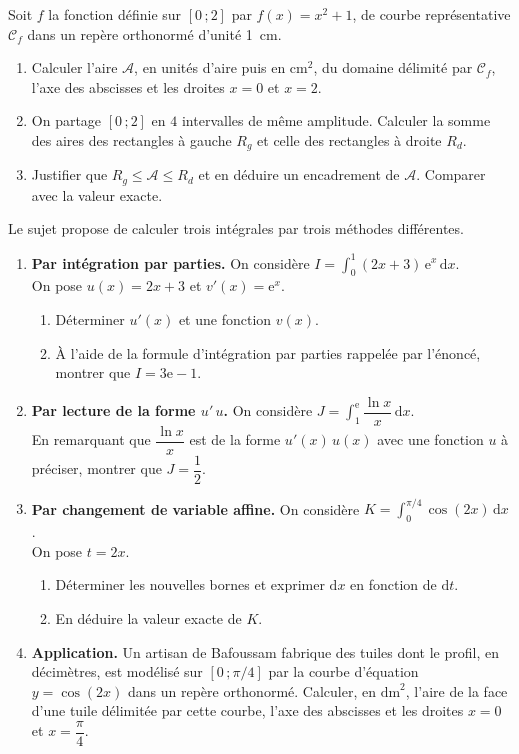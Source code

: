 \documentclass[11pt]{article}
\newcounter{popsec}
\newcounter{popsub}
\newcommand{\courssub}[1]{%
  \stepcounter{popsub}%
  \par\vspace{9pt}\noindent{\popxbold\fontsize{11.5}{13}\selectfont\color{popink}{\color{poporange}\thepopsec.\thepopsub}\hspace{6pt}#1}\par\nopagebreak\vspace{4pt}
}
\begin{document}
\begin{exercice}
Soit $f$ la fonction définie sur $[0\,;2]$ par $f(x)=x^2+1$, de courbe représentative $\mathcal{C}_f$ dans un repère orthonormé d'unité \SI{1}{cm}.
\begin{enumerate}
\item Calculer l'aire $\mathcal{A}$, en unités d'aire puis en $\mathrm{cm}^2$, du domaine délimité par $\mathcal{C}_f$, l'axe des abscisses et les droites $x=0$ et $x=2$.
\item On partage $[0\,;2]$ en $4$ intervalles de même amplitude. Calculer la somme des aires des rectangles à gauche $R_g$ et celle des rectangles à droite $R_d$.
\item Justifier que $R_g \le \mathcal{A} \le R_d$ et en déduire un encadrement de $\mathcal{A}$. Comparer avec la valeur exacte.
\end{enumerate}
\end{exercice}

\courssub{Je me prépare au Bac}

\begin{exercice}
Le sujet propose de calculer trois intégrales par trois méthodes différentes.
\begin{enumerate}
\item \textbf{Par intégration par parties.} On considère $I=\displaystyle\int_0^1 (2x+3)\,\mathrm{e}^{x}\,\mathrm{d}x$.\\
On pose $u(x)=2x+3$ et $v'(x)=\mathrm{e}^{x}$.
\begin{enumerate}
\item Déterminer $u'(x)$ et une fonction $v(x)$.
\item À l'aide de la formule d'intégration par parties rappelée par l'énoncé, montrer que $I=3\mathrm{e}-1$.
\end{enumerate}
\item \textbf{Par lecture de la forme $u'\,u$.} On considère $J=\displaystyle\int_1^{\mathrm{e}} \dfrac{\ln x}{x}\,\mathrm{d}x$.\\
En remarquant que $\dfrac{\ln x}{x}$ est de la forme $u'(x)\,u(x)$ avec une fonction $u$ à préciser, montrer que $J=\dfrac{1}{2}$.
\item \textbf{Par changement de variable affine.} On considère $K=\displaystyle\int_0^{\pi/4} \cos(2x)\,\mathrm{d}x$.\\
On pose $t=2x$.
\begin{enumerate}
\item Déterminer les nouvelles bornes et exprimer $\mathrm{d}x$ en fonction de $\mathrm{d}t$.
\item En déduire la valeur exacte de $K$.
\end{enumerate}
\item \textbf{Application.} Un artisan de Bafoussam fabrique des tuiles dont le profil, en décimètres, est modélisé sur $[0\,;\pi/4]$ par la courbe d'équation $y=\cos(2x)$ dans un repère orthonormé. Calculer, en $\mathrm{dm}^2$, l'aire de la face d'une tuile délimitée par cette courbe, l'axe des abscisses et les droites $x=0$ et $x=\dfrac{\pi}{4}$.
\end{enumerate}
\end{exercice}
\end{document}
